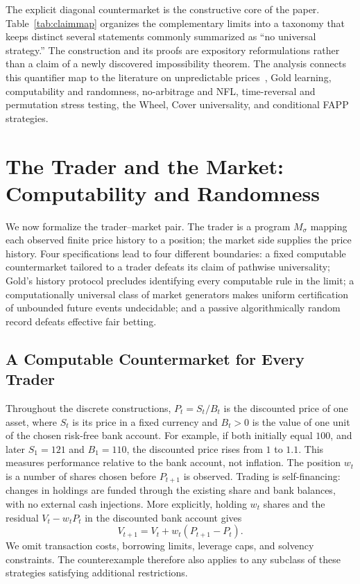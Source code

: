 \documentclass[aps,pra,reprint,superscriptaddress,amsmath,amssymb,floatfix]{revtex4-2}
\theoremstyle{plain}
\theoremstyle{definition}
\theoremstyle{remark}
\begin{document}
The explicit diagonal countermarket is the constructive core of the paper.
Table~\ref{tab:claimmap} organizes the complementary limits into a taxonomy that
keeps distinct several statements commonly summarized as ``no universal
strategy.'' The construction and its proofs are expository reformulations
rather than a claim of a newly discovered impossibility theorem.
The analysis connects this quantifier map to the literature on unpredictable
prices~\cite{Bachelier1900,Samuelson1965,Fama1970}, Gold learning, computability
and randomness, no-arbitrage and NFL, time-reversal and permutation stress
testing, the Wheel, Cover universality, and conditional FAPP strategies.

\section{The Trader and the Market: Computability and Randomness}
\label{sec:computability}

We now formalize the trader--market pair. The trader is a program
\(M_\sigma\) mapping each observed finite price history to a position; the
market side supplies the price history. Four specifications lead to four
different boundaries: a fixed computable countermarket tailored to a trader
defeats its claim of pathwise universality; Gold's history protocol precludes
identifying every computable rule in the limit; a computationally universal
class of market generators makes uniform certification of unbounded future
events undecidable; and a passive algorithmically random record defeats
effective fair betting.

\subsection{A Computable Countermarket for Every Trader}

Throughout the discrete constructions, \(P_t=S_t/B_t\) is the discounted
price of one asset, where \(S_t\) is its price in a fixed currency and
\(B_t>0\) is the value of one unit of the chosen risk-free bank account.
For example, if both initially equal \(100\), and later \(S_1=121\) and
\(B_1=110\), the discounted price rises from \(1\) to \(1.1\).
This measures performance relative to the bank account, not inflation.
The position \(w_t\) is a number of shares chosen before \(P_{t+1}\) is
observed. Trading is self-financing: changes in holdings are funded through
the existing share and bank balances, with no external cash injections.
More explicitly, holding \(w_t\) shares and the residual
\(V_t-w_tP_t\) in the discounted bank account gives
\[
  V_{t+1}=V_t+w_t(P_{t+1}-P_t).
\]
We omit transaction costs, borrowing limits, leverage caps, and solvency
constraints. The counterexample therefore also applies to any subclass of
these strategies satisfying additional restrictions.
\end{document}
